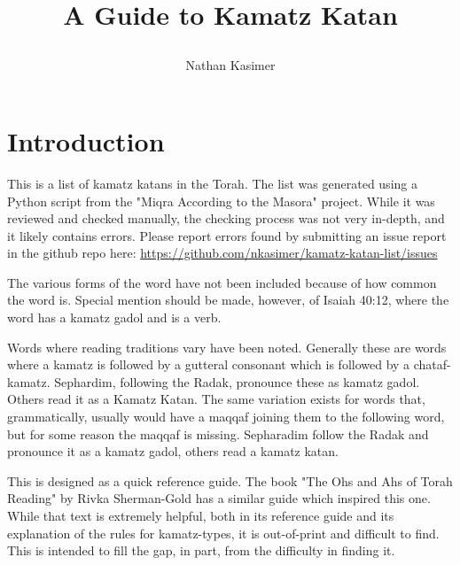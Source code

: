 	\title{
		
		A Guide to Kamatz Katan}
	
	\author{Nathan Kasimer}
	
	\date{}
	
	\maketitle
	
	\tableofcontents
	
	\chapter{Introduction}
	This is a list of kamatz katans in the Torah.  The list was generated using a Python script from the "Miqra According to the Masora" project.  While it was reviewed and checked manually, the checking process was not very in-depth, and it likely contains errors.  Please report errors found by submitting an issue report in the github repo here: \url{https://github.com/nkasimer/kamatz-katan-list/issues}
	
	The various forms of the word  have not been included because of how common the word is.  Special mention should be made, however, of Isaiah 40:12, where the word  has a kamatz gadol and is a verb.
	
	Words where reading traditions vary have been noted.  Generally these are words where a kamatz is followed by a gutteral consonant which is followed by a chataf-kamatz.  Sephardim, following the Radak, pronounce these as kamatz gadol. Others read it as a Kamatz Katan. The same variation exists for words that, grammatically, usually would have a maqqaf joining them to the following word, but for some reason the maqqaf is missing. Sepharadim follow the Radak and pronounce it as a kamatz gadol, others read a kamatz katan.
	
	This is designed as a quick reference guide.  The book "The Ohs and Ahs of Torah Reading" by Rivka Sherman-Gold has a similar guide which inspired this one.  While that text is extremely helpful, both in its reference guide and its explanation of the rules for kamatz-types, it is out-of-print and difficult to find. This is intended to fill the gap, in part, from the difficulty in finding it.
	
	
